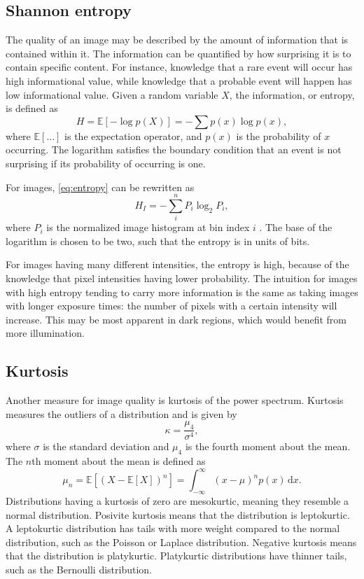 \subsection{Shannon entropy}
The quality of an image may be described by the amount of information that is contained within it.
The information can be quantified by how surprising it is to contain specific content.
For instance, knowledge that a rare event will occur has high informational value, while knowledge that a probable event will happen has low informational value.
Given a random variable $X$, the information, or entropy, is defined as
\begin{equation}\label{eq:entropy}
    H = \mathbb{E}[-\log p(X)] = -\sum p(x) \log p(x),
\end{equation}
where $\mathbb{E}[\ldots]$ is the expectation operator, and $p(x)$ is the probability of $x$ occurring.
The logarithm satisfies the boundary condition that an event is not surprising if its probability of occurring is one.

For images, \cref{eq:entropy} can be rewritten as
\begin{equation}
    H_I = -\sum_{i}^n P_i \log_2 P_i,
\end{equation}
where $P_i$ is the normalized image histogram at bin index $i$ .
The base of the logarithm is chosen to be two, such that the entropy is in units of bits.

For images having many different intensities, the entropy is high, because of the knowledge that pixel intensities having lower probability.
The intuition for images with high entropy tending to carry more information is the same as taking images with longer exposure times:
the number of pixels with a certain intensity will increase.
This may be most apparent in dark regions, which would benefit from more illumination.

\subsection{Kurtosis}
Another measure for image quality is kurtosis of the power spectrum.
Kurtosis measures the outliers of a distribution and is given by
\begin{equation}
    \kappa = \frac{\mu_4}{\sigma^4},
\end{equation}
where $\sigma$ is the standard deviation and $\mu_4$ is the fourth moment about the mean.
The $n$th moment about the mean is defined as
\begin{equation}
    \mu_n = \mathbb{E}[(X-\mathbb{E}[X])^n] = \int_{-\infty}^\infty (x-\mu)^n p(x)\,\mathrm{d}x.
\end{equation}
Distributions having a kurtosis of zero are mesokurtic, meaning they resemble a normal distribution.
Posivite kurtosis means that the distribution is leptokurtic.
A leptokurtic distribution has tails with more weight compared to the normal distribution, such as the Poisson or Laplace distribution.
Negative kurtosis means that the distribution is platykurtic.
Platykurtic distributions have thinner tails, such as the Bernoulli distribution.

